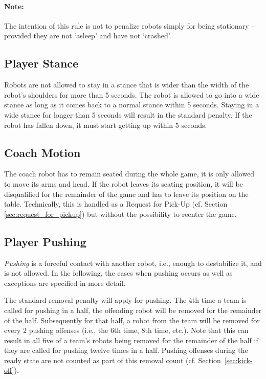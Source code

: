 \documentclass[12pt]{article}
\newcommand{\cf}{\mbox{cf.}\xspace}
\begin{document}
\paragraph{Note:} The intention of this rule is not to penalize robots simply for being stationary -- provided they are not `asleep' and have not `crashed'.

\subsection{Player Stance}
\label{sec:player_stance}

Robots are not allowed to stay in a stance that is wider than the width of the robot's shoulders for more than 5 seconds. The robot is allowed to go into a wide stance as long as it comes back to a normal stance within 5 seconds. Staying in a wide stance for longer than 5 seconds will result in the standard penalty. If the robot has fallen down, it must start getting up within 5 seconds. 

\subsection{Coach Motion}
\label{sec:coach_motion}

The coach robot has to remain seated during the whole game, it is only allowed to move its arms and head. If the robot leaves its seating position, it will be disqualified for the remainder of the game and has to leave its position on the table. Technically, this is handled as a Request for Pick-Up
(\cf Section \ref{sec:request_for_pickup}) but without the possibility to reenter the game.

\subsection{Player Pushing}
\label{sec:player_pushing}

\emph{Pushing} is a forceful contact with another robot, i.e., enough to destabilize it, and is not allowed. In the following, the cases when pushing occurs as well as exceptions are specified in more detail.

The standard removal penalty will apply for pushing. The 4th time a team is called for pushing in a
half, the offending robot will be removed for the remainder of the half. Subsequently for that half,
a robot from the team will be removed for every 2 pushing offenses (i.e., the 6th time, 8th time, etc.).  Note that this can result in all five of a team's robots being removed for the remainder of the half if they are called for pushing twelve times in a half.  Pushing offenses during the ready state are not counted as part of this removal count (\cf Section~\ref{sec:kick-off}).
\end{document}

